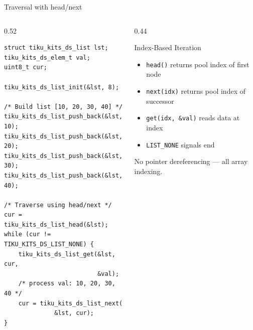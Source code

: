 \documentclass[aspectratio=169, 10pt]{beamer}
\begin{document}
\begin{frame}[fragile]{Traversal with head/next}
\begin{columns}[T]
\begin{column}{0.52\textwidth}
\begin{lstlisting}[style=cstyle,
  title={Iterating through the list}]
struct tiku_kits_ds_list lst;
tiku_kits_ds_elem_t val;
uint8_t cur;

tiku_kits_ds_list_init(&lst, 8);

/* Build list [10, 20, 30, 40] */
tiku_kits_ds_list_push_back(&lst, 10);
tiku_kits_ds_list_push_back(&lst, 20);
tiku_kits_ds_list_push_back(&lst, 30);
tiku_kits_ds_list_push_back(&lst, 40);

/* Traverse using head/next */
cur = tiku_kits_ds_list_head(&lst);
while (cur != TIKU_KITS_DS_LIST_NONE) {
    tiku_kits_ds_list_get(&lst, cur,
                          &val);
    /* process val: 10, 20, 30, 40 */
    cur = tiku_kits_ds_list_next(
              &lst, cur);
}
\end{lstlisting}
\end{column}

\begin{column}{0.44\textwidth}
\begin{center}
\end{center}

\vspace{1em}
\begin{block}{Index-Based Iteration}
\begin{itemize}
  \item \texttt{head()} returns pool index of first node
  \item \texttt{next(idx)} returns pool index of successor
  \item \texttt{get(idx, \&val)} reads data at index
  \item \texttt{LIST\_NONE} signals end
\end{itemize}
No pointer dereferencing --- all array indexing.
\end{block}
\end{column}
\end{columns}
\end{frame}
\end{document}
